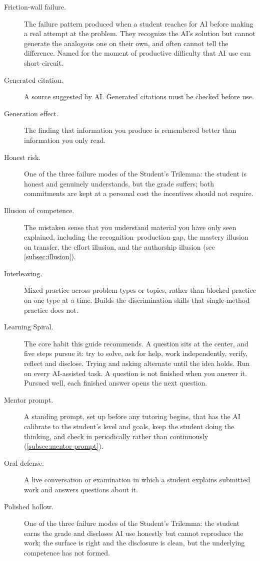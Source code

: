 \documentclass{SIAMbook2023}
\begin{document}
\begin{description}
\item[Friction-wall failure.] The failure pattern produced when a student reaches for AI before making a real attempt at the problem. They recognize the AI's solution but cannot generate the analogous one on their own, and often cannot tell the difference. Named for the moment of productive difficulty that AI use can short-circuit.
\item[Generated citation.] A source suggested by AI. Generated citations must be checked before use.
\item[Generation effect.] The finding that information you produce is remembered better than information you only read.
\item[Honest risk.] One of the three failure modes of the Student's Trilemma: the student is honest and genuinely understands, but the grade suffers; both commitments are kept at a personal cost the incentives should not require.
\item[Illusion of competence.] The mistaken sense that you understand material you have only seen explained, including the recognition--production gap, the mastery illusion on transfer, the effort illusion, and the authorship illusion (see \cref{subsec:illusion}).
\item[Interleaving.] Mixed practice across problem types or topics, rather than blocked practice on one type at a time. Builds the discrimination skills that single-method practice does not.
\item[Learning Spiral.] The core habit this guide recommends. A question sits at the center, and five steps pursue it: try to solve, ask for help, work independently, verify, reflect and disclose. Trying and asking alternate until the idea holds. Run on every AI-assisted task. A question is not finished when you answer it. Pursued well, each finished answer opens the next question.
\item[Mentor prompt.] A standing prompt, set up before any tutoring begins, that has the AI calibrate to the student's level and goals, keep the student doing the thinking, and check in periodically rather than continuously (\cref{subsec:mentor-prompt}).
\item[Oral defense.] A live conversation or examination in which a student explains submitted work and answers questions about it.
\item[Polished hollow.] One of the three failure modes of the Student's Trilemma: the student earns the grade and discloses AI use honestly but cannot reproduce the work; the surface is right and the disclosure is clean, but the underlying competence has not formed.

\end{description}
\end{document}
